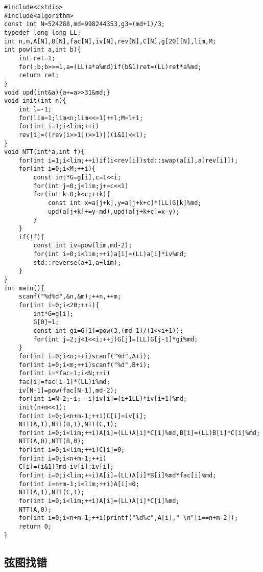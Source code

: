 \documentclass[12pt]{ctexart}
\begin{document}
\begin{lstlisting}
#include<cstdio>
#include<algorithm>
const int N=524288,md=998244353,g3=(md+1)/3;
typedef long long LL;
int n,m,A[N],B[N],fac[N],iv[N],rev[N],C[N],g[20][N],lim,M;
int pow(int a,int b){
    int ret=1;
    for(;b;b>>=1,a=(LL)a*a%md)if(b&1)ret=(LL)ret*a%md;
    return ret;
}
void upd(int&a){a+=a>>31&md;}
void init(int n){
    int l=-1;
    for(lim=1;lim<n;lim<<=1)++l;M=l+1;
    for(int i=1;i<lim;++i)
    rev[i]=((rev[i>>1])>>1)|((i&1)<<l);
}
void NTT(int*a,int f){
    for(int i=1;i<lim;++i)if(i<rev[i])std::swap(a[i],a[rev[i]]);
    for(int i=0;i<M;++i){
        const int*G=g[i],c=1<<i;
        for(int j=0;j<lim;j+=c<<1)
        for(int k=0;k<c;++k){
            const int x=a[j+k],y=a[j+k+c]*(LL)G[k]%md;
            upd(a[j+k]+=y-md),upd(a[j+k+c]=x-y);
        }
    }
    if(!f){
        const int iv=pow(lim,md-2);
        for(int i=0;i<lim;++i)a[i]=(LL)a[i]*iv%md;
        std::reverse(a+1,a+lim);
    }
}
int main(){
    scanf("%d%d",&n,&m);++n,++m;
    for(int i=0;i<20;++i){
        int*G=g[i];
        G[0]=1;
        const int gi=G[1]=pow(3,(md-1)/(1<<i+1));
        for(int j=2;j<1<<i;++j)G[j]=(LL)G[j-1]*gi%md;
    }
    for(int i=0;i<n;++i)scanf("%d",A+i);
    for(int i=0;i<m;++i)scanf("%d",B+i);
    for(int i=*fac=1;i<N;++i)
    fac[i]=fac[i-1]*(LL)i%md;
    iv[N-1]=pow(fac[N-1],md-2);
    for(int i=N-2;~i;--i)iv[i]=(i+1LL)*iv[i+1]%md;
    init(n+m<<1);
    for(int i=0;i<n+m-1;++i)C[i]=iv[i];
    NTT(A,1),NTT(B,1),NTT(C,1);
    for(int i=0;i<lim;++i)A[i]=(LL)A[i]*C[i]%md,B[i]=(LL)B[i]*C[i]%md;
    NTT(A,0),NTT(B,0);
    for(int i=0;i<lim;++i)C[i]=0;
    for(int i=0;i<n+m-1;++i)
    C[i]=(i&1)?md-iv[i]:iv[i];
    for(int i=0;i<lim;++i)A[i]=(LL)A[i]*B[i]%md*fac[i]%md;
    for(int i=n+m-1;i<lim;++i)A[i]=0;
    NTT(A,1),NTT(C,1);
    for(int i=0;i<lim;++i)A[i]=(LL)A[i]*C[i]%md;
    NTT(A,0);
    for(int i=0;i<n+m-1;++i)printf("%d%c",A[i]," \n"[i==n+m-2]);
    return 0;
}
\end{lstlisting}

\subsection{弦图找错}
\end{document}
